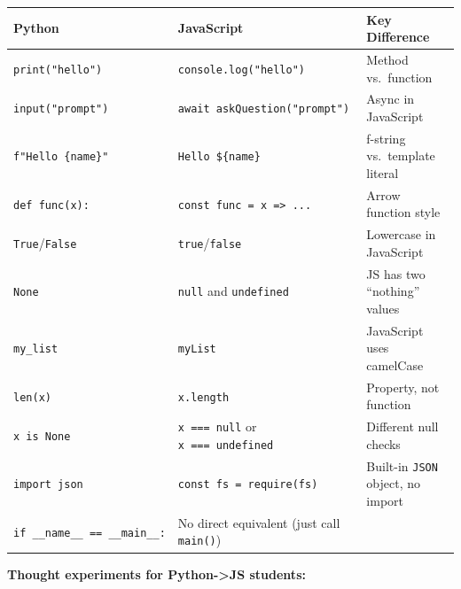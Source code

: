 \documentclass[
  justified,
  openright,
]{tufte-book}
\begin{document}
{\def\LTcaptype{none} %
\begin{longtable}[]{@{}
  >{\raggedright\arraybackslash}p{}
  >{\raggedright\arraybackslash}p{}
  >{\raggedright\arraybackslash}p{}@{}}
\toprule\noalign{}
\begin{minipage}[b]{\linewidth}\raggedright
Python
\end{minipage} & \begin{minipage}[b]{\linewidth}\raggedright
JavaScript
\end{minipage} & \begin{minipage}[b]{\linewidth}\raggedright
Key Difference
\end{minipage} \\
\midrule\noalign{}
\endhead
\bottomrule\noalign{}
\endlastfoot
\texttt{print("hello")} & \texttt{console.log("hello")} & Method
vs.~function \\
\texttt{input("prompt")} & \texttt{await\ askQuestion("prompt")} & Async
in JavaScript \\
\texttt{f"Hello\ \{name\}"} &
\texttt{\textasciigrave{}Hello\ \$\{name\}\textasciigrave{}} & f-string
vs.~template literal \\
\texttt{def\ func(x):} &
\texttt{const\ func\ =\ x\ =\textgreater{}\ ...} & Arrow function
style \\
\texttt{True}/\texttt{False} & \texttt{true}/\texttt{false} & Lowercase
in JavaScript \\
\texttt{None} & \texttt{null} and \texttt{undefined} & JS has two
``nothing'' values \\
\texttt{my\_list} & \texttt{myList} & JavaScript uses camelCase \\
\texttt{len(x)} & \texttt{x.length} & Property, not function \\
\texttt{x\ is\ None} & \texttt{x\ ===\ null} or
\texttt{x\ ===\ undefined} & Different null checks \\
\texttt{import\ json} &
\texttt{const\ fs\ =\ require(\textquotesingle{}fs\textquotesingle{})} &
Built-in \texttt{JSON} object, no import \\
\texttt{if\ \_\_name\_\_\ ==\ \textquotesingle{}\_\_main\_\_\textquotesingle{}:}
& No direct equivalent (just call \texttt{main()}) & \\
\end{longtable}
}

\textbf{Thought experiments for Python-\textgreater JS students:}
\end{document}
